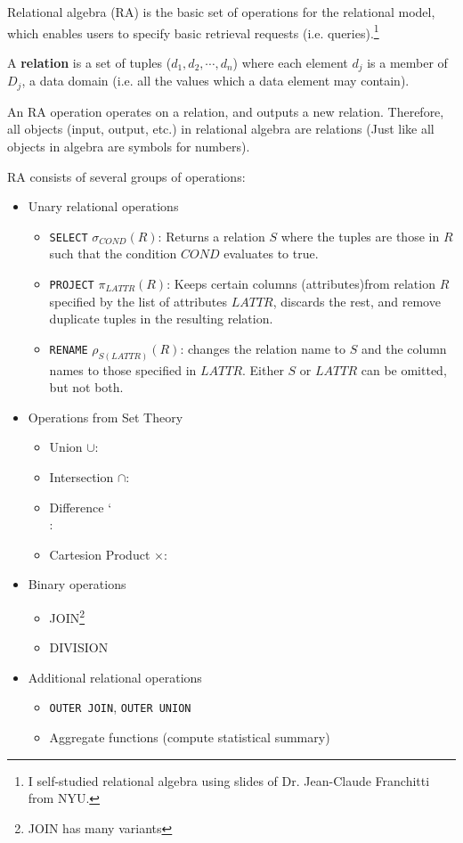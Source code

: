 \documentclass[12pt]{article}
\begin{document}
Relational algebra (RA) is the basic set of operations for the relational model, which enables users to specify basic retrieval requests (i.e. queries).\footnote{I self-studied relational algebra using slides of Dr. Jean-Claude Franchitti from NYU.}

A \textbf{relation} is a set of tuples ($d_1, d_2,\cdots, d_n$) where each element $d_j$ is a member of $D_j$, a data domain (i.e. all the values which a data element may contain).

An RA operation operates on a relation, and outputs a new relation. Therefore, all objects (input, output, etc.) in relational algebra are relations (Just like all objects in algebra are symbols for numbers).

RA consists of several groups of operations:
\begin{itemize}
\item Unary relational operations
  \begin{itemize}
  \item \texttt{SELECT} $\sigma_{COND}(R)$: Returns a relation $S$ where the tuples are those in $R$ such that the condition $COND$ evaluates to true.
  \item \texttt{PROJECT} $\pi_{LATTR}(R)$: Keeps certain columns (attributes)from relation $R$ specified by the list of attributes $LATTR$, discards the rest, and remove duplicate tuples in the resulting relation.
    \item \texttt{RENAME} $\rho_{S(LATTR)}(R)$: changes the relation name to $S$ and the column names to those specified in $LATTR$. Either $S$ or $LATTR$ can be omitted, but not both.
  \end{itemize}

\item Operations from Set Theory
  \begin{itemize}
  \item Union $\cup$:
  \item Intersection $\cap$:
  \item Difference \char`\\:
  \item Cartesion Product $\times$:
  \end{itemize}

\item Binary operations
  \begin{itemize}
  \item JOIN\footnote{JOIN has many variants}
  \item DIVISION
  \end{itemize}

\item Additional relational operations
  \begin{itemize}
  \item \texttt{OUTER JOIN}, \texttt{OUTER UNION}
  \item Aggregate functions (compute statistical summary)
  \end{itemize}
  
\end{itemize}





\end{document}
